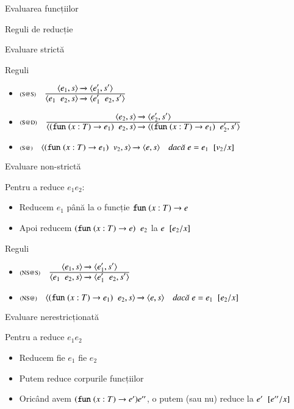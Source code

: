 \documentclass[xcolor=pdftex,romanian,colorlinks]{beamer}
\begin{document}
\begin{section}{Evaluarea funcțiilor}
\begin{subsection}{Reguli de reducție}
\begin{frame}{Evaluare strictă}
\begin{block}{Reguli}
\begin{itemize}
\item[]$\reg[S@S]{\Ss{\c{e_1\mathrel{}e_2,s}}{\c{e_1'\mathrel{}e_2,s'}}}{\Ss{\c{e_1,s}}{\c{e_1',s'}}}{}$
\item[]$\reg[S@D]{\Ss{\c{(\Sfun (x:T) \rightarrow e_1)\mathrel{}e_2,s}}{\c{(\Sfun (x:T) \rightarrow e_1)\mathrel{}e_2',s'}}}{\Ss{\c{e_2,s}}{\c{e_2',s'}}}{}$
\item[]$\reg[S@]{\Ss{\c{(\Sfun (x:T) \rightarrow e_1)\mathrel{}v_2,s}}{\c{e,s}}}{}{e = \substapp{e_1}{\subst{\substpair{v_2}{x}}}}$
\end{itemize}
\end{block}
\end{frame}


\begin{frame}{Evaluare non-strictă} 
\begin{block}{}
Pentru a reduce $e_1 \mathrel{} e_2$:
\begin{itemize}
\item  Reducem $e_1$ până la o funcție $\mathrel{\text{\ttfamily fun}} (x : T) \rightarrow e$
\item Apoi reducem $(\mathrel{\text{\ttfamily fun}} (x : T) \rightarrow e) \mathrel{}e_2$ la $e\mathrel{}[e_2/x]$
\end{itemize}
\end{block}

\begin{block}{Reguli}
\begin{itemize}
\item[]$\reg[NS@S]{\Ss{\c{e_1\mathrel{}e_2,s}}{\c{e_1'\mathrel{}e_2,s'}}}{\Ss{\c{e_1,s}}{\c{e_1',s'}}}{}$
\item[]$\reg[NS@]{\Ss{\c{(\Sfun (x:T) \rightarrow e_1)\mathrel{}e_2,s}}{\c{e,s}}}{}{e = \substapp{e_1}{\subst{\substpair{e_2}{x}}}}$
\end{itemize}
\end{block}
\end{frame}

\begin{frame}{Evaluare nerestricționată}
\begin{block}{}
Pentru a reduce $e_1 \mathrel{} e_2$
\begin{itemize}
\item Reducem fie $e_1$ fie $e_2$
\item Putem reduce corpurile funcțiilor
\item Oricând avem  $(\mathrel{\text{\ttfamily fun}} (x : T) \rightarrow e') e''$, o putem (sau nu)
reduce la $e'\mathrel{}[e''/x]$
\end{itemize} 
\end{block}


\end{frame}
\end{subsection}
\end{section}
\end{document}
